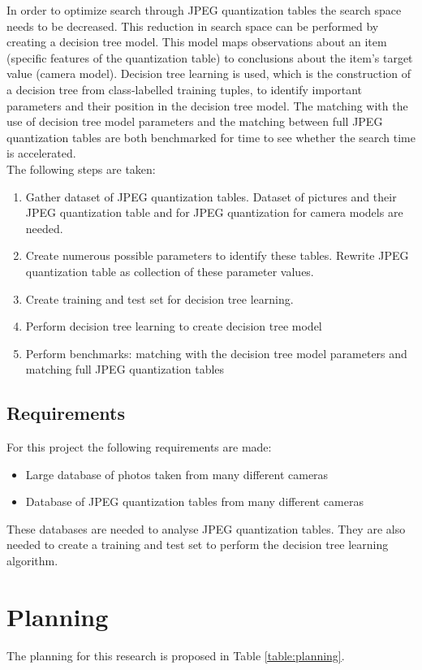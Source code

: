 \documentclass[a4paper,8pt]{article}
\begin{document}
In order to optimize search through JPEG quantization tables the search space needs to be decreased. This reduction in search space can be performed by creating a decision tree model. This model maps observations about an item (specific features of the quantization table) to conclusions about the item's target value (camera model). Decision tree learning is used, which is the construction of a decision tree from class-labelled training tuples, to identify important parameters and their position in the decision tree model. The matching with the use of decision tree model parameters and the matching between full JPEG quantization tables are both benchmarked for time to see whether the search time is accelerated.
~\\
The following steps are taken:
\begin{enumerate}
\item Gather dataset of JPEG quantization tables. Dataset of pictures and their JPEG quantization table and for JPEG quantization for camera models are needed.
\item Create numerous possible parameters to identify these tables. Rewrite JPEG quantization table as collection of these parameter values.
\item Create training and test set for decision tree learning.
\item Perform decision tree learning to create decision tree model
\item Perform benchmarks: matching with the decision tree model parameters and matching full JPEG quantization tables
\end{enumerate}


\subsection*{Requirements}

For this project the following requirements are made:

\begin{itemize}
\item Large database of photos taken from many different cameras
\item Database of JPEG quantization tables from many different cameras
\end{itemize}

These databases are needed to analyse JPEG quantization tables. They are also needed to create a training and test set to perform the decision tree learning algorithm.

\section*{Planning}
The planning for this research is proposed in Table \ref{table:planning}.
\end{document}

